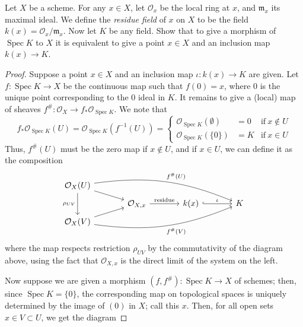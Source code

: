 \documentclass[10pt]{article}
\theoremstyle{definition}
\theoremstyle{remark}
\numberwithin{equation}{section}
\numberwithin{figure}{subsubsection}
\DeclareMathOperator{\Spec}{Spec}
\newcommand{\OO}{\mathcal{O}}
\begin{document}
\begin{problem}
  Let $X$ be a scheme. For any $x \in X$, let $\OO_x$ be the local ring at $x$, and $\mathfrak{m}_x$ its maximal ideal. We define the \emph{residue field} of $x$ on $X$ to be the field $k(x) = \OO_x/\mathfrak{m}_x$. Now let $K$ be any field. Show that to give a morphism of $\Spec K$ to $X$ it is equivalent to give a point $x \in X$ and an inclusion map $k(x) \to K$.
\end{problem}
\begin{proof}
  Suppose a point $x \in X$ and an inclusion map $\iota \colon k(x) \to K$ are
  given. Let $f\colon \Spec K \to X$ be the continuous map such that
  $f(\mathfrak{0}) = x$, where $\mathfrak{0}$ is the unique point
  corresponding to the $0$ ideal in $K$. It remains to give a (local) map of
  sheaves $f^\#\colon \OO_X \to f_*\OO_{\Spec K}$. We note that
  \begin{equation*}
    f_*\OO_{\Spec K}(U) = \OO_{\Spec K}(f^{-1}(U)) = \left\{
    \begin{alignedat}{3}
      \OO_{\Spec K}(\emptyset) &= 0 & \text{if}\ x \notin U\\
      \OO_{\Spec K}(\{\mathfrak{0}\}) &= K & \text{if}\ x \in U
    \end{alignedat}
    \right.
  \end{equation*}
  Thus, $f^\#(U)$ must be the zero map if $x \notin U$, and if $x \in U$, we can
  define it as the composition
  \begin{equation}\label{eq:fhash}
    \begin{tikzcd}[row sep=tiny,column sep=large]
      \OO_X(U)\arrow{dd}[swap]{\rho_{UV}}\arrow{dr}
      \arrow[bend left=15]{drrr}{f^\#(U)}\\
      & \OO_{X,x} \rar{\mathrm{residue}} & k(x) \rar[hook]{\iota} & K\\
      \OO_X(V)\arrow{ur}\arrow[bend right=15]{urrr}[swap]{f^\#(V)}
    \end{tikzcd}
  \end{equation}
  where the map respects restriction $\rho_{UV}$ by the commutativity of the
  diagram above, using the fact that $\OO_{X,x}$ is the direct limit of the
  system on the left.
  \par Now suppose we are given a morphism $(f,f^\#)\colon\Spec K \to X$ of
  schemes; then, since $\Spec K = \{\mathfrak{0}\}$, the corresponding map on
  topological spaces is uniquely determined by the image of $(0)$ in $X$; call this
  $x$. Then, for all open sets $x \in V \subset U$, we get the diagram

\end{proof}
\end{document}
